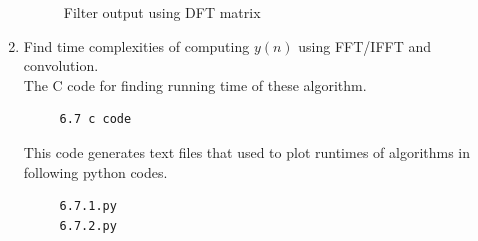\documentclass[journal,12pt,twocolumn]{IEEEtran}
\renewcommand\thesection{\arabic{section}}
\begin{document}
\begin{enumerate}[label=\thesection.\arabic*]
\begin{figure}[!ht]
     \caption{Filter output using DFT matrix}
     \label{fig:6.6}
     \end{figure}
\item  Find time complexities of computing $y(n)$ using FFT/IFFT and convolution. \\
\solution The C code for finding running time of these algorithm.
\begin{lstlisting}
     6.7 c code
\end{lstlisting}
This code generates text files that used to plot runtimes of algorithms in following python codes.
\begin{lstlisting}
     6.7.1.py
     6.7.2.py
\end{lstlisting}

\end{enumerate}
\end{document}
